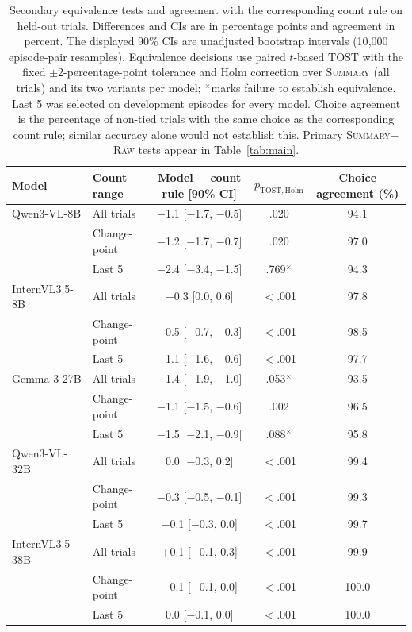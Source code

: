 \documentclass[letterpaper]{article} %
\newcommand{\Raw}{\textsc{Raw}}
\newcommand{\Summary}{\textsc{Summary}}
\begin{document}
\begin{table}[!t]\centering\small
  \setlength{\tabcolsep}{6pt}
  \begin{tabular}{ll ccc}
    \toprule
    Model & Count range & Model $-$ count rule [90\% CI] & $p_{\mathrm{TOST,Holm}}$ & Choice agreement (\%) \\
    \midrule
    Qwen3-VL-8B & All trials & $-$1.1 [$-$1.7, $-$0.5] & .020 & 94.1 \\
     & Change-point & $-$1.2 [$-$1.7, $-$0.7] & .020 & 97.0 \\
     & Last 5 & $-$2.4 [$-$3.4, $-$1.5] & .769$^{\times}$ & 94.3 \\
    InternVL3.5-8B & All trials & +0.3 [0.0, 0.6] & $<$.001 & 97.8 \\
     & Change-point & $-$0.5 [$-$0.7, $-$0.3] & $<$.001 & 98.5 \\
     & Last 5 & $-$1.1 [$-$1.6, $-$0.6] & $<$.001 & 97.7 \\
    Gemma-3-27B & All trials & $-$1.4 [$-$1.9, $-$1.0] & .053$^{\times}$ & 93.5 \\
     & Change-point & $-$1.1 [$-$1.5, $-$0.6] & .002 & 96.5 \\
     & Last 5 & $-$1.5 [$-$2.1, $-$0.9] & .088$^{\times}$ & 95.8 \\
    Qwen3-VL-32B & All trials & 0.0 [$-$0.3, 0.2] & $<$.001 & 99.4 \\
     & Change-point & $-$0.3 [$-$0.5, $-$0.1] & $<$.001 & 99.3 \\
     & Last 5 & $-$0.1 [$-$0.3, 0.0] & $<$.001 & 99.7 \\
    InternVL3.5-38B & All trials & +0.1 [$-$0.1, 0.3] & $<$.001 & 99.9 \\
     & Change-point & $-$0.1 [$-$0.1, 0.0] & $<$.001 & 100.0 \\
     & Last 5 & 0.0 [$-$0.1, 0.0] & $<$.001 & 100.0 \\
    \bottomrule
  \end{tabular}
  \caption{Secondary equivalence tests and agreement with the corresponding count rule on held-out trials. Differences and CIs are in percentage points and agreement in percent. The displayed 90\% CIs are unadjusted bootstrap intervals (10{,}000 episode-pair resamples). Equivalence decisions use paired $t$-based TOST with the fixed $\pm$2-percentage-point tolerance and Holm correction over \Summary{} (all trials) and its two variants per model; $^{\times}$marks failure to establish equivalence. Last 5 was selected on development episodes for every model. Choice agreement is the percentage of non-tied trials with the same choice as the corresponding count rule; similar accuracy alone would not establish this. Primary \Summary{}$-$\Raw{} tests appear in Table~\ref{tab:main}.}
  \label{tab:tests}
\end{table}
\end{document}
